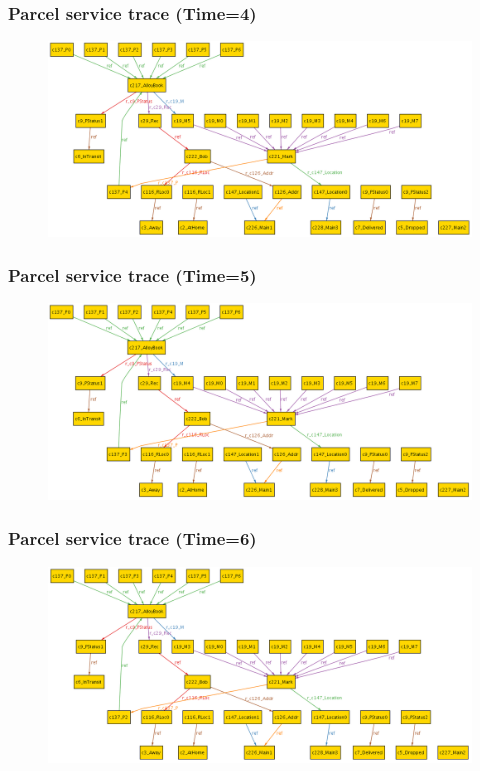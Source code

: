 \documentclass[xcolor=dvipsnames,mathserif,12pt,backend=biber]{beamer}
\begin{document}
  \begin{frame}
    \frametitle{Parcel service trace (Time=4)}
\begin{figure}
\includegraphics[width=1.1 \textwidth]{Figures/Shipping_Time4.png}
\end{figure}
  \end{frame}
  \begin{frame}
    \frametitle{Parcel service trace (Time=5)}
\begin{figure}
\includegraphics[width=1.1 \textwidth]{Figures/Shipping_Time5.png}
\end{figure}
  \end{frame}
  \begin{frame}
    \frametitle{Parcel service trace (Time=6)}
\begin{figure}
\includegraphics[width=1.1 \textwidth]{Figures/Shipping_Time6.png}
\end{figure}
  \end{frame}
\end{document}
